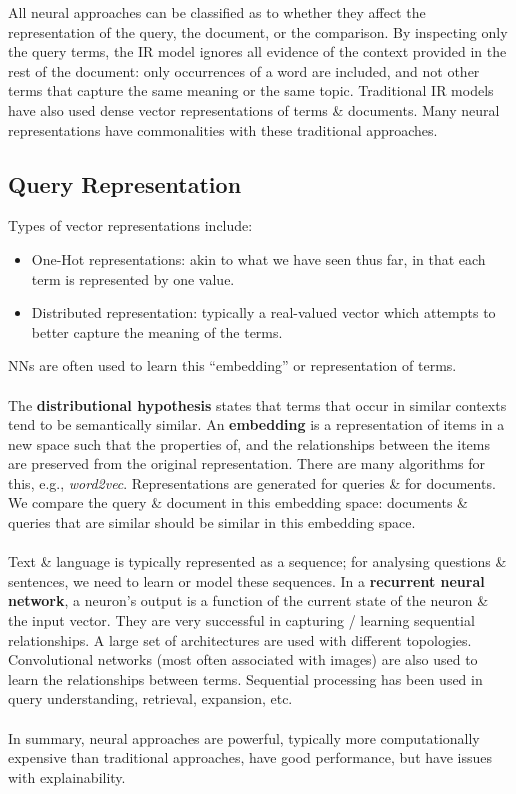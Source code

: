 \documentclass[a4paper,11pt]{article}
\begin{document}
All neural approaches can be classified as to whether they affect the representation of the query, the document, or the comparison.
By inspecting only the query terms, the IR model ignores all evidence of the context provided in the rest of the document: only occurrences of a word are included, and not other terms that capture the same meaning or the same topic.
Traditional IR models have also used dense vector representations of terms \& documents.
Many neural representations have commonalities with these traditional approaches.

\subsection{Query Representation}
Types of vector representations include:
\begin{itemize}
    \item   One-Hot representations: akin to what we have seen thus far, in that each term is represented by one value.
    \item   Distributed representation: typically a real-valued vector which attempts to better capture the meaning of the terms.
\end{itemize}

NNs are often used to learn this ``embedding'' or representation of terms.
\\\\
The \textbf{distributional hypothesis} states that terms that occur in similar contexts tend to be semantically similar.
An \textbf{embedding} is a representation of items in a new space such that the properties of, and the relationships between the items are preserved from the original representation.
There are many algorithms for this, e.g., \textit{word2vec}.
Representations are generated for queries \& for documents.
We compare the query \& document in this embedding space: documents \& queries that are similar should be similar in this embedding space.
\\\\
Text \& language is typically represented as a sequence; 
for analysing questions \& sentences, we need to learn or model these sequences.
In a \textbf{recurrent neural network}, a neuron's output is a function of the current state of the neuron \& the input vector.
They are very successful in capturing / learning sequential relationships.
A large set of architectures are used with different topologies.
Convolutional networks (most often associated with images) are also used to learn the relationships between terms.
Sequential processing has been used in query understanding, retrieval, expansion, etc.
\\\\
In summary, neural approaches are powerful, typically more computationally expensive than traditional approaches, have good performance, but have issues with explainability.
\end{document}
